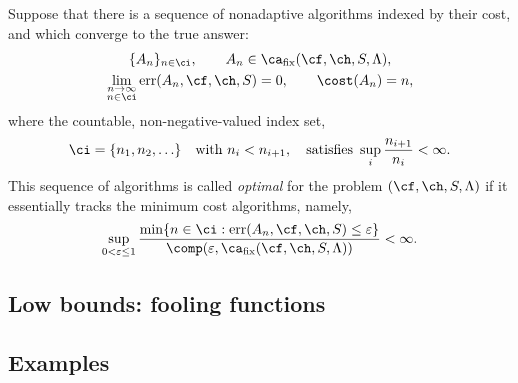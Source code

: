 \documentclass[final]{elsarticle}
\DeclareMathOperator{\err}{err}
\theoremstyle{definition}
\theoremstyle{remark}
\DeclareMathOperator{\fix}{fix}
\begin{document}
Suppose that there is a sequence of nonadaptive algorithms indexed by their cost, and which converge to the true answer:
\begin{subequations} \label{algseqdef}
\begin{gather}
\{A_n\}_{n \in \ci}, \qquad A_n  \in \ca_{\fix}(\cf,\ch,S,\Lambda), \\
\lim_{\substack{n \to \infty\\ n \in \ci}} \err(A_n,\cf,\ch,S) = 0, \qquad \cost(A_n) = n,
\end{gather}
\end{subequations}
where the countable, non-negative-valued index set,
\begin{equation} \label{indexdef}
\ci=\{n_1, n_2, \ldots\} \quad \text{with } n_i < n_{i+1}, \quad \text{satisfies } \sup_i \frac{n_{i+1}}{n_i} <\infty.
\end{equation}
This sequence of algorithms is called \emph{optimal} for the problem $(\cf,\ch,S,\Lambda)$ if it essentially tracks the minimum cost algorithms, namely,
\begin{equation} \label{nearoptdef}
\sup_{0 < \varepsilon \le 1} \frac{\min\{n \in \ci : \err(A_n,\cf,\ch,S) \le \varepsilon\}} {\comp(\varepsilon,\ca_{\fix}(\cf,\ch,S,\Lambda))} <\infty.
\end{equation}

\subsection{Low bounds: fooling functions}

\subsection{Examples}



\end{document}
